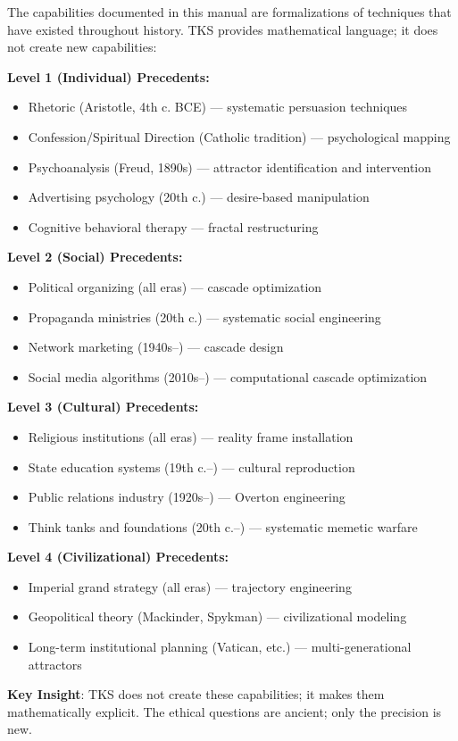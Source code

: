 \documentclass[11pt,twoside]{book}
\begin{document}
\begin{tcolorbox}[colback=blue!5!white,colframe=blue!65!black,title=\textbf{Pre-TKS Analogues},breakable]

The capabilities documented in this manual are formalizations of techniques that
have existed throughout history. TKS provides mathematical language; it does not
create new capabilities:

\bigskip
\textbf{Level 1 (Individual) Precedents:}
\begin{itemize}
    \item Rhetoric (Aristotle, 4th c. BCE) --- systematic persuasion techniques
    \item Confession/Spiritual Direction (Catholic tradition) --- psychological mapping
    \item Psychoanalysis (Freud, 1890s) --- attractor identification and intervention
    \item Advertising psychology (20th c.) --- desire-based manipulation
    \item Cognitive behavioral therapy --- fractal restructuring
\end{itemize}

\textbf{Level 2 (Social) Precedents:}
\begin{itemize}
    \item Political organizing (all eras) --- cascade optimization
    \item Propaganda ministries (20th c.) --- systematic social engineering
    \item Network marketing (1940s--) --- cascade design
    \item Social media algorithms (2010s--) --- computational cascade optimization
\end{itemize}

\textbf{Level 3 (Cultural) Precedents:}
\begin{itemize}
    \item Religious institutions (all eras) --- reality frame installation
    \item State education systems (19th c.--) --- cultural reproduction
    \item Public relations industry (1920s--) --- Overton engineering
    \item Think tanks and foundations (20th c.--) --- systematic memetic warfare
\end{itemize}

\textbf{Level 4 (Civilizational) Precedents:}
\begin{itemize}
    \item Imperial grand strategy (all eras) --- trajectory engineering
    \item Geopolitical theory (Mackinder, Spykman) --- civilizational modeling
    \item Long-term institutional planning (Vatican, etc.) --- multi-generational attractors
\end{itemize}

\textbf{Key Insight}: TKS does not create these capabilities; it makes them
mathematically explicit. The ethical questions are ancient; only the precision
is new.

\end{tcolorbox}
\end{document}
